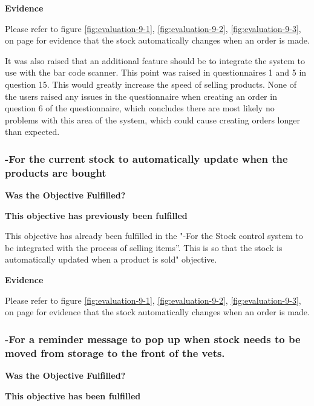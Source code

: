 \textbf{Evidence} \newline

Please refer to figure \ref{fig:evaluation-9-1}, \ref{fig:evaluation-9-2}, \ref{fig:evaluation-9-3}, on  page \pageref{automatic-stock-evidence} for evidence that the stock automatically changes when an order is made.

It was also raised that an additional feature should be to integrate the system to use with the bar code scanner. This point was raised in questionnaires 1 and 5 in question 15. This would greatly increase the speed of selling products. None of the users raised any issues in the questionnaire when creating an order in question 6 of the questionnaire, which concludes there are most likely no problems with this area of the system, which could cause creating orders longer than expected.




\pagebreak
\subsubsection{-For the current stock to automatically update when the products are bought}
\textbf{Was the Objective Fulfilled?} \newline

\textbf{\large{This objective has previously been fulfilled}}

This objective has already been fulfilled in the "-For the Stock control system to be integrated with the process of selling items''. This is so that the stock is automatically updated when a product is sold" objective.

\textbf{Evidence} \newline

Please refer to figure \ref{fig:evaluation-9-1}, \ref{fig:evaluation-9-2}, \ref{fig:evaluation-9-3}, on  page \pageref{automatic-stock-evidence} for evidence that the stock automatically changes when an order is made.



\pagebreak
\subsubsection{-For a reminder message to pop up when stock needs to be moved from storage to the front of the vets. }
\textbf{Was the Objective Fulfilled?} \newline

\textbf{\large{This objective has been fulfilled}}

